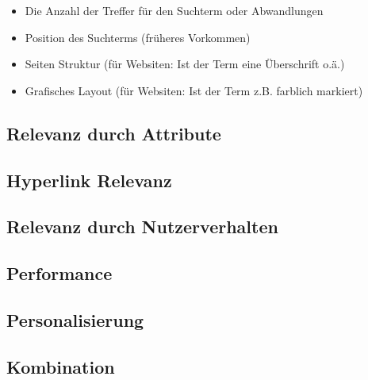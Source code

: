 \begin{itemize}
  \item Die Anzahl der Treffer für den Suchterm oder Abwandlungen
  \item Position des Suchterms (früheres Vorkommen)
  \item Seiten Struktur (für Websiten: Ist der Term eine Überschrift o.ä.)
  \item Grafisches Layout (für Websiten: Ist der Term z.B. farblich markiert)
\end{itemize}
\subsection{Relevanz durch Attribute}

\subsection{Hyperlink Relevanz}

\subsection{Relevanz durch Nutzerverhalten}

\subsection{Performance}

\subsection{Personalisierung}

\subsection{Kombination}
